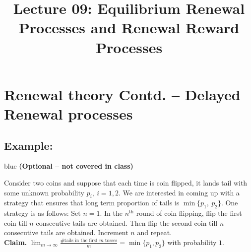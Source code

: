 \documentclass[a4paper,10pt,english]{article}
\title{Lecture 09: Equilibrium Renewal Processes and Renewal Reward Processes}
\author{}
\begin{document}
\maketitle
\section{Renewal theory Contd. -- Delayed Renewal processes }

\subsection{Example:}

\begin{color}{blue} {\bf (Optional -- not covered in class)} \end{color}

Consider two coins and suppose  that each time is coin flipped, it lands tail with some unknown probability $p_i,~i=1,2.$ We are interested in coming up with a strategy that ensures that long term proportion of tails is $\min\{p_1,~p_2\}.$ One strategy is as follows: Set $n = 1$. In the $n^\text{th}$ round of coin flipping, flip the first coin till $n$ consecutive tails are obtained. Then flip the second coin till $n$ consecutive tails are obtained. Increment $n$ and repeat. \\

{\bf Claim.} $\lim_{m \to \infty} \frac{\# \mbox{tails in the first
    $m$ tosses}}{m} = \min\{p_1, p_2\}$ with probability $1$.\\
\end{document}
